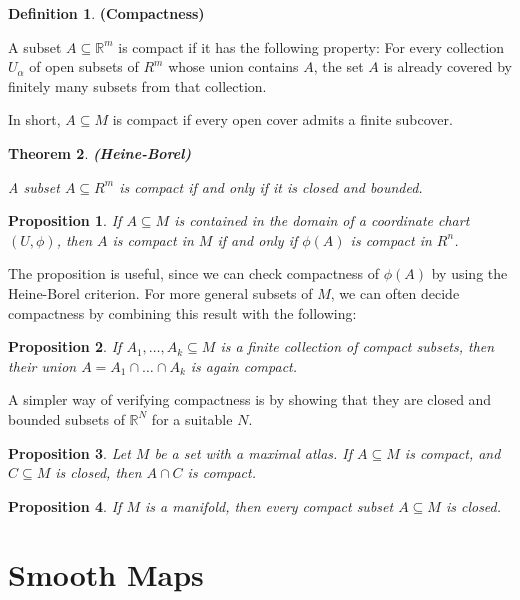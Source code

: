 \documentclass{article}
\newtheorem{theorem}{Theorem}[section]
\newtheorem{proposition}{Proposition}[theorem]
\theoremstyle{definition}
\newtheorem{defn}[theorem]{Definition}
\newenvironment{definition}
  {\vspace{8pt}\begin{mdframed}[backgroundcolor=blueish,innertopmargin=4]\begin{defn}}
  {\end{defn}\end{mdframed}\vspace{4pt}}
\begin{document}
\begin{definition} \textbf{(Compactness)}

A subset $A \subseteq \mathbb R^m$ is compact if it has the following property: For every collection ${U_\alpha}$ of open subsets of $R^m$ whose union contains $A$, the set $A$ is already covered by finitely many subsets from that collection. 
\end{definition}
In short, $A \subseteq M$ is compact if every open cover admits a finite subcover.

\begin{theorem} \textbf{(Heine-Borel)}

A subset $A \subseteq R^m$ is compact if and only if it is closed
and bounded.
\end{theorem}

\begin{proposition}

If $A \subseteq M$ is contained in the domain of a coordinate chart $(U,\phi)$, then $A$ is compact in $M$ if and only if $\phi(A)$ is compact in $R^n$.
\end{proposition}

The proposition is useful, since we can check compactness of $\phi(A)$ by using the Heine-Borel criterion. For more general subsets of $M$, we can often decide compactness by combining this result with the following:

\begin{proposition}

If $A_1,\dots,A_k \subseteq M$ is a finite collection of compact subsets, then their union $A = A_1 \cap \dots \cap A_k$ is again compact.
\end{proposition}

A simpler way of verifying compactness is by showing that they are closed and bounded subsets of $\mathbb R^N$ for a suitable $N$.

\begin{proposition}

Let $M$ be a set with a maximal atlas. If $A \subseteq M$ is compact, and $C \subseteq M$ is closed, then $A \cap C$ is compact.
\end{proposition}

\begin{proposition}
If $M$ is a manifold, then every compact subset $A \subseteq M$ is closed.
\end{proposition}

\newpage
\section{Smooth Maps}
\end{document}
